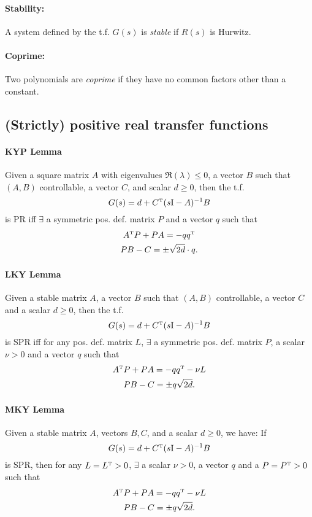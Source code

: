 \paragraph{Stability:} A system defined by the t.f. $G(s)$ is \emph{stable} if $R(s)$ is Hurwitz.

\paragraph{Coprime:} Two polynomials are \emph{coprime} if they have no common factors other than a constant.

\subsection{(Strictly) positive real transfer functions}

\paragraph{KYP Lemma}
Given a square matrix $A$ with eigenvalues $\Re(\lambda) \leq 0$, a vector $B$ such that $(A,B)$ controllable, a vector $C$, and scalar $d \geq 0$, then the t.f.
\begin{equation}
	G(s) = d + C^{\scriptscriptstyle \mathrm{T}} (s \mathrm{I} - A)^{-1} B
\end{equation}
is PR iff $\exists$ a symmetric pos. def. matrix $P$ and a vector $q$ such that
\begin{gather}
	A^{\scriptscriptstyle \mathrm{T}} P + P A = -q q^{\scriptscriptstyle \mathrm{T}} \\
	P B - C = \pm \sqrt{2d} \cdot q
	.
\end{gather}

\paragraph{LKY Lemma}
Given a stable matrix $A$, a vector $B$ such that $(A,B)$ controllable, a vector $C$ and a scalar $d \geq 0$, then the t.f.
\begin{equation}
	G(s) = d + C^{\scriptscriptstyle \mathrm{T}} (s \mathrm{I} - A)^{-1} B
\end{equation}
is SPR iff for any pos. def. matrix $L$, $\exists$ a symmetric pos. def. matrix $P$, a scalar $\nu > 0$ and a vector $q$ such that
\begin{gather}
	A^{\scriptscriptstyle \mathrm{T}} P + P A = -q q^{\scriptscriptstyle \mathrm{T}} - \nu L \\
	P B - C = \pm q \sqrt{2d}
	.
\end{gather}

\paragraph{MKY Lemma}
Given a stable matrix $A$, vectors $B,C$, and a scalar $d \geq 0$, we have: If
\begin{equation}
	G(s) = d + C^{\scriptscriptstyle \mathrm{T}} (s \mathrm{I} - A)^{-1} B
\end{equation}
is SPR, then for any $L = L^{\scriptscriptstyle \mathrm{T}} > 0$, $\exists$ a scalar $\nu > 0$, a vector $q$ and a $P = P^{\scriptscriptstyle \mathrm{T}} > 0$ such that
\begin{gather}
	A^{\scriptscriptstyle \mathrm{T}} P + P A = -q q^{\scriptscriptstyle \mathrm{T}} - \nu L \\
	P B - C = \pm q \sqrt{2d}
	.
\end{gather}